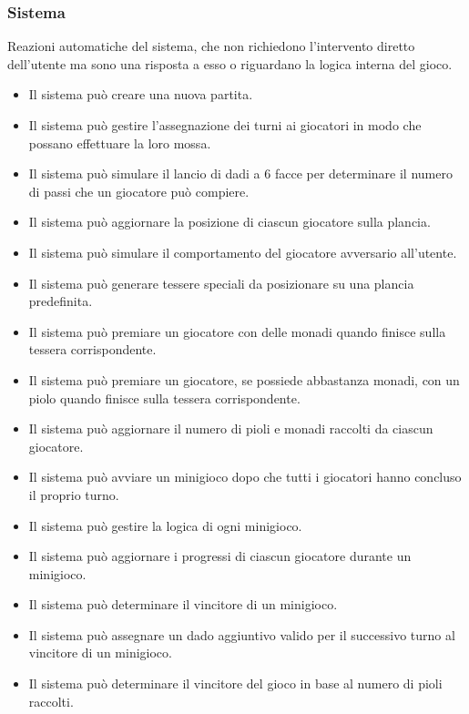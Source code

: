 \subsubsection{Sistema} \label{sec:functional-requirements:system}
Reazioni automatiche del sistema, che non richiedono l'intervento
diretto dell'utente ma sono una risposta a esso o riguardano la logica interna del gioco.
\begin{itemize}
    \item Il sistema può creare una nuova partita.
    \item Il sistema può gestire l'assegnazione dei turni ai giocatori in modo che possano
          effettuare la loro mossa.
    \item Il sistema può simulare il lancio di dadi a 6 facce per determinare il numero di
          passi che un giocatore può compiere.
    \item Il sistema può aggiornare la posizione di ciascun giocatore sulla plancia.
    \item Il sistema può simulare il comportamento del giocatore avversario all'utente.
    \item Il sistema può generare tessere speciali da posizionare su una plancia predefinita.
    \item Il sistema può premiare un giocatore con delle monadi quando finisce sulla
          tessera corrispondente.
    \item Il sistema può premiare un giocatore, se possiede abbastanza monadi, con un
          piolo quando finisce sulla tessera corrispondente.
    \item Il sistema può aggiornare il numero di pioli e monadi raccolti da ciascun giocatore.
    \item Il sistema può avviare un minigioco dopo che tutti i giocatori hanno concluso
          il proprio turno.
    \item Il sistema può gestire la logica di ogni minigioco.
    \item Il sistema può aggiornare i progressi di ciascun giocatore durante un minigioco.
    \item Il sistema può determinare il vincitore di un minigioco.
    \item Il sistema può assegnare un dado aggiuntivo valido per il successivo turno al
          vincitore di un minigioco.
    \item Il sistema può determinare il vincitore del gioco in base al numero di pioli raccolti.
\end{itemize}